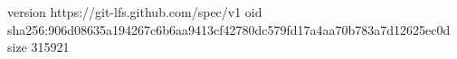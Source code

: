 version https://git-lfs.github.com/spec/v1
oid sha256:906d08635a194267c6b6aa9413cf42780dc579fd17a4aa70b783a7d12625ec0d
size 315921
